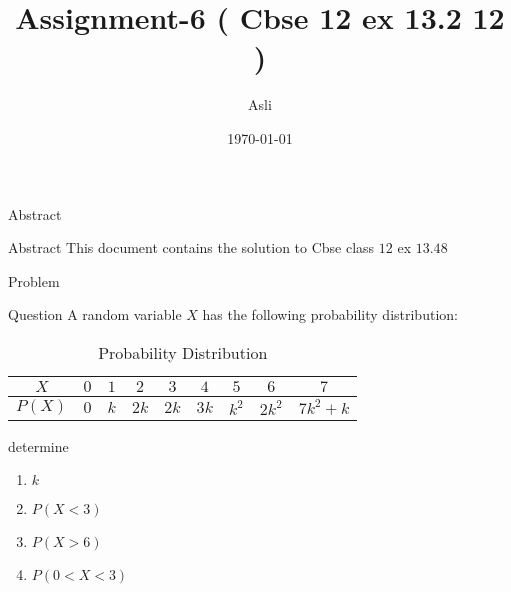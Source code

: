 \documentclass{beamer}
\title{ Assignment-6 ( Cbse 12 ex 13.2 12 )}
\author{Asli}
\institute{IIT Hyderabad}
\date{\today }
\begin{document}
\begin{frame}
      \titlepage
\end{frame}



\begin{frame}{Abstract}
     \begin{block}{Abstract}
          This document contains the solution to Cbse class $12$ ex $13.4 8$
      \end{block}
\end{frame}



\begin{frame}{Problem}
       \begin{block}{Question}
           A random variable $X$ has the following probability distribution:
           
               \begin{table}[!htb]
                     \centering
                            {
                                   \begin{tabular}{|c|c|c|c|c|c|c|c|c|}
                                       \hline
                                         $X$ & $0$ & $1$ & $2$ & $3$ & $4$ & $5$ & $6$ & $7$  \\ \hline
                                      $P(X)$ & $0$ & $k$ & $2k$ & $2k$ & $3k$ & $k^{2}$ & $2 k^{2}$ &    $7k^{2}+k$ \\ \hline
                                   \end{tabular}
                              }
                         \caption{ Probability Distribution }
                         \label{tab:table}
              \end{table}
              
              determine
              
              \begin{enumerate}
                  \item $k$
                  \item $P(X < 3)$
                  \item $P(X > 6)$
                  \item $P(0 < X < 3)$
              \end{enumerate}
                          
       \end{block}
       
\end{frame}
\end{document}
